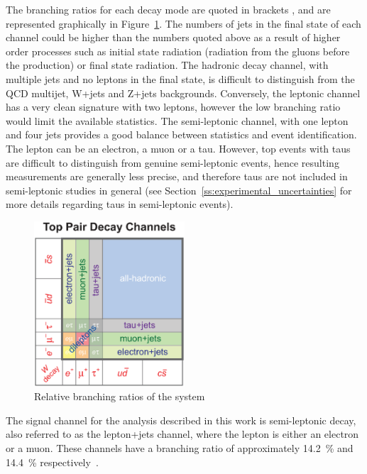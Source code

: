 The branching ratios for each decay mode are quoted in brackets \cite{Agashe:2014kda}, and are represented
graphically in Figure~\ref{fig:ttbar_branching_ratios}. The numbers of jets in the final state of each channel
could be higher than the numbers quoted above as a result of higher order processes such as initial state
radiation (radiation from the gluons before the \ttbar production) or final state radiation. The hadronic
decay channel, with multiple jets and no leptons in the final state, is difficult to distinguish from the QCD
multijet, W+jets and Z+jets backgrounds. Conversely, the leptonic channel has a very clean signature with two
leptons, however the low branching ratio would limit the available statistics. The semi-leptonic channel, with
one lepton and four jets provides a good balance between statistics and event identification. The lepton can
be an electron, a muon or a tau. However, top events with taus are difficult to distinguish from genuine
semi-leptonic events, hence resulting measurements are generally less precise, and therefore taus are not
included in semi-leptonic \tquark studies in general (see Section~\ref{ss:experimental_uncertainties} for more
details regarding taus in semi-leptonic \ttbar events).

\begin{figure}[hbtp]
   \centering
     \includegraphics[width=0.5\textwidth]{Chapters/03_Top_Physics/Images/top_pair_decay_channels}\hfill
     \caption[Relative branching ratios of the \ttbar system]{Relative branching ratios of the \ttbar system}
     \label{fig:ttbar_branching_ratios}
\end{figure}

The signal channel for the analysis described in this work is semi-leptonic \ttbar decay, also referred to as
the lepton+jets channel, where the lepton is either an electron or a muon. These channels have a branching
ratio of approximately 14.2~\% and 14.4~\% respectively~\cite{Agashe:2014kda}.

